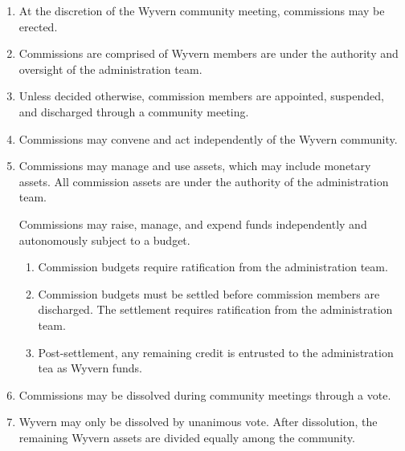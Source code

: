 \begin{enumerate}
    \item At the discretion of the Wyvern community meeting, commissions may be erected.

    \item Commissions are comprised of Wyvern members are under the authority and oversight of the administration team.

    \item Unless decided otherwise, commission members are appointed, suspended, and discharged through a community meeting.

    \item Commissions may convene and act independently of the Wyvern community.

    \item Commissions may manage and use assets, which may include monetary assets. All commission assets are under the authority of the administration team.

    \begin{item}
            Commissions may raise, manage, and expend funds independently and autonomously subject to a budget.
            \begin{enumerate}
                \item Commission budgets require ratification from the administration team.
                \item Commission budgets must be settled before commission members are discharged. The settlement requires ratification from the administration team.
                \item Post-settlement, any remaining credit is entrusted to the administration tea as Wyvern funds.
            \end{enumerate}
    \end{item}

    \item Commissions may be dissolved during community meetings through a vote.

    \item Wyvern may only be dissolved by unanimous vote. After dissolution, the remaining Wyvern assets are divided equally among the community.

\end{enumerate}

